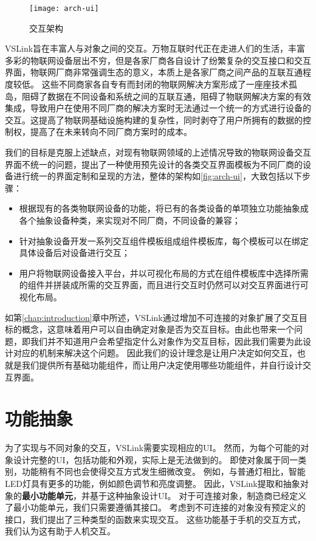 \begin{figure}[htbp]
	\centering
	\texttt{[image: arch-ui]}
	\caption{交互架构}
	\label{fig:arch-ui}
\end{figure}

VSLink旨在丰富人与对象之间的交互。万物互联时代正在走进人们的生活，丰富多彩的物联网设备层出不穷，但是各家厂商各自设计了纷繁复杂的交互接口和交互界面，物联网厂商非常强调生态的意义，本质上是各家厂商之间产品的互联互通程度较低。
这些不同商家各自专有而封闭的物联网解决方案形成了一座座技术孤岛，阻碍了数据在不同设备和系统之间的互联互通，阻碍了物联网解决方案的有效集成，导致用户在使用不同厂商的解决方案时无法通过一个统一的方式进行设备的交互。这提高了物联网基础设施构建的复杂性，同时剥夺了用户所拥有的数据的控制权，提高了在未来转向不同厂商方案时的成本。

我们的目标是克服上述缺点，对现有物联网领域的上述情况导致的物联网设备交互界面不统一的问题，提出了一种使用预先设计的各类交互界面模板为不同厂商的设备进行统一的界面定制和呈现的方法，整体的架构如\autoref{fig:arch-ui}，大致包括以下步骤：

\begin{itemize}
	\item 根据现有的各类物联网设备的功能，将已有的各类设备的单项独立功能抽象成各个抽象设备种类，来实现对不同厂商，不同设备的兼容；
	\item 针对抽象设备开发一系列交互组件模板组成组件模板库，每个模板可以在绑定具体设备后对设备进行交互；
	\item 用户将物联网设备接入平台，并以可视化布局的方式在组件模板库中选择所需的组件并拼装成所需的交互界面，而且进行交互时仍然可以对交互界面进行可视化布局。
\end{itemize}

如第\ref{chap:introduction}章中所述，VSLink通过增加不可连接的对象扩展了交互目标的概念，这意味着用户可以自由确定对象是否为交互目标。由此也带来一个问题，即我们并不知道用户会希望指定什么对象作为交互目标，因此我们需要为此设计对应的机制来解决这个问题。
因此我们的设计理念是让用户决定如何交互，也就是我们提供所有基础功能组件，而让用户决定使用哪些功能组件，并自行设计交互界面。

\section{功能抽象}
为了实现与不同对象的交互，VSLink需要实现相应的UI。
然而，为每个可能的对象设计完整的UI，包括功能和外观，实际上是无法做到的。
即使对象属于同一类别，功能稍有不同也会使得交互方式发生细微改变。
例如，与普通灯相比，智能LED灯具有更多的功能，例如颜色调节和亮度调整。
因此，VSLink提取和抽象对象的\textbf{最小功能单元}，并基于这种抽象设计UI。
对于可连接对象，制造商已经定义了最小功能单元，我们只需要遵循其接口。
考虑到不可连接的对象没有预定义的接口，我们提出了三种类型的函数来实现交互。
这些功能基于手机的交互方式，我们认为这有助于人机交互。

